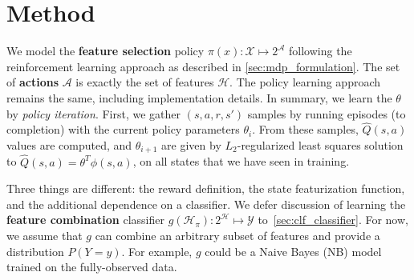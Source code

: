 \section{Method}\label{sec:clf_method}

We model the \textbf{feature selection} policy $\pi(x): \mathcal{X} \mapsto 2^\mathcal{A}$ following the reinforcement learning approach as described in \autoref{sec:mdp_formulation}.
The set of \textbf{actions} $\mathcal{A}$ is exactly the set of features $\mathcal{H}$.
The policy learning approach remains the same, including implementation details.
In summary, we learn the $\theta$ by \emph{policy iteration}.
First, we gather $(s, a, r, s')$ samples by running episodes (to completion) with the current policy parameters $\theta_i$.
From these samples, $\hat{Q}(s, a)$ values are computed, and $\theta_{i+1}$ are given by $L_2$-regularized least squares solution to $\hat{Q}(s, a) = \theta^T \phi(s, a)$, on all states that we have seen in training.

Three things are different: the reward definition, the state featurization function, and the additional dependence on a classifier.
We defer discussion of learning the \textbf{feature combination} classifier $g(\mathcal{H}_\pi) : 2^\mathcal{H} \mapsto \mathcal{Y}$ to~\autoref{sec:clf_classifier}.
For now, we assume that $g$ can combine an arbitrary subset of features and provide a distribution $P(Y = y)$.
For example, $g$ could be a Naive Bayes (NB) model trained on the fully-observed data.






